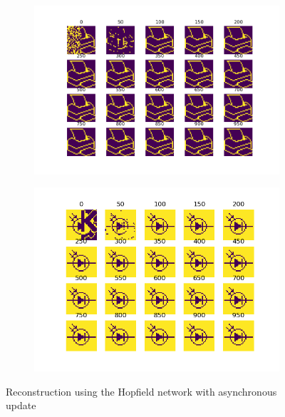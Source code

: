 \documentclass[a4paper]{article}
\begin{document}
\begin{figure}[ht]
   \begin{subfigure}[b]{0.5\textwidth}
   \centering
   \includegraphics[width=\linewidth]{figures/p10.png}
   \end{subfigure}
  \begin{subfigure}[b]{0.5\textwidth}
   \centering
   \includegraphics[width=\linewidth]{figures/p11correct.png}
   \end{subfigure}
   \caption{Reconstruction using the Hopfield network with asynchronous update}
   \label{fig:asynchronous}
\end{figure}
\end{document}
